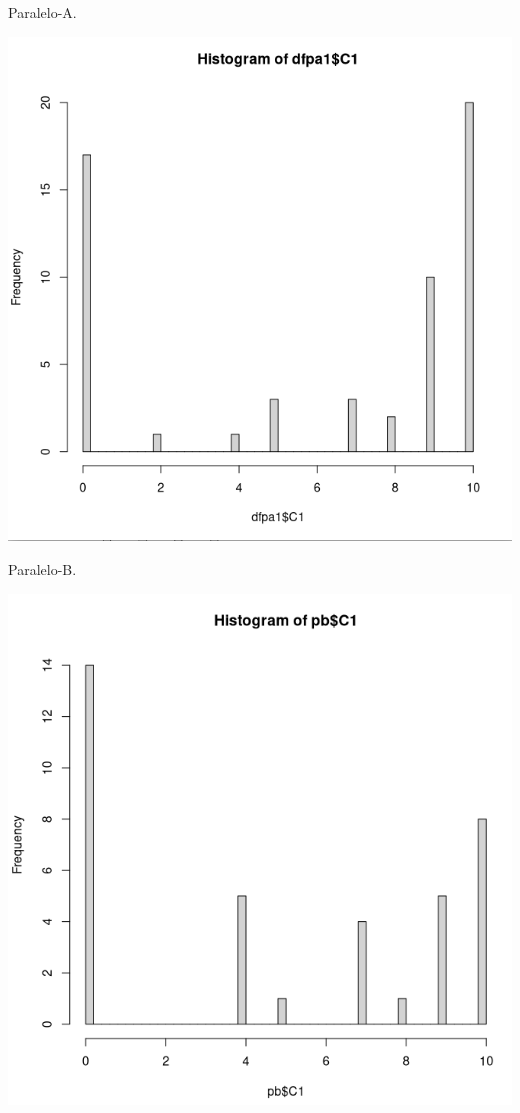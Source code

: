 \documentclass[a4pa<per,12pt,spanish]{article}
\begin{document}
\begin{minipage}[h]{0.45\linewidth}
  Paralelo-A.
  
\includegraphics[scale=0.3]{images/histoC1.png}
\end{minipage}
\begin{minipage}[h]{0.45\linewidth}
  Paralelo-B.
  
\includegraphics[scale=0.3]{images/histo-PB-C1.png}
\end{minipage}
\end{document}
